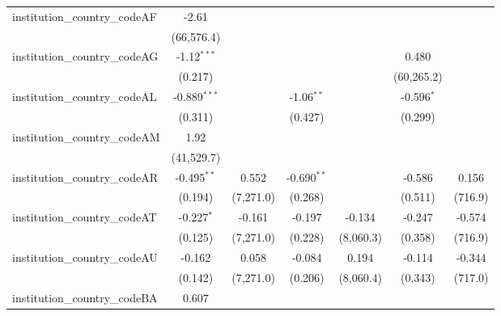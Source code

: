 \begin{tabular}{lcccccc}
   institution\_country\_codeAF          & -2.61          &               &                &                &                &   \\   
                                         & (66,576.4)     &               &                &                &                &   \\   
   institution\_country\_codeAG          & -1.12$^{***}$  &               &                &                & 0.480          &   \\   
                                         & (0.217)        &               &                &                & (60,265.2)     &   \\   
   institution\_country\_codeAL          & -0.889$^{***}$ &               & -1.06$^{**}$   &                & -0.596$^{*}$   &   \\   
                                         & (0.311)        &               & (0.427)        &                & (0.299)        &   \\   
   institution\_country\_codeAM          & 1.92           &               &                &                &                &   \\   
                                         & (41,529.7)     &               &                &                &                &   \\   
   institution\_country\_codeAR          & -0.495$^{**}$  & 0.552         & -0.690$^{**}$  &                & -0.586         & 0.156\\   
                                         & (0.194)        & (7,271.0)     & (0.268)        &                & (0.511)        & (716.9)\\   
   institution\_country\_codeAT          & -0.227$^{*}$   & -0.161        & -0.197         & -0.134         & -0.247         & -0.574\\   
                                         & (0.125)        & (7,271.0)     & (0.228)        & (8,060.3)      & (0.358)        & (716.9)\\   
   institution\_country\_codeAU          & -0.162         & 0.058         & -0.084         & 0.194          & -0.114         & -0.344\\   
                                         & (0.142)        & (7,271.0)     & (0.206)        & (8,060.4)      & (0.343)        & (717.0)\\   
   institution\_country\_codeBA          & 0.607          &               &                &                &                &   \\   

\end{tabular}
